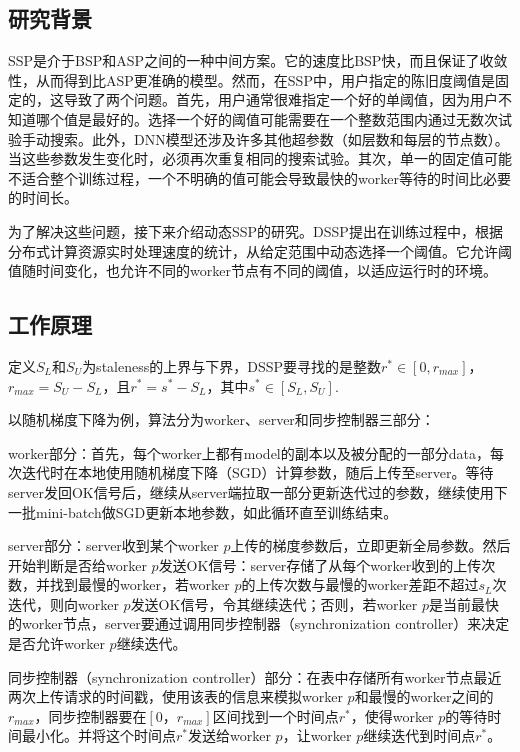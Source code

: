 \documentclass[11pt]{article}
\begin{document}
    \subsection{研究背景}
    SSP是介于BSP和ASP之间的一种中间方案。它的速度比BSP快，而且保证了收敛性，从而得到比ASP更准确的模型。然而，在SSP中，用户指定的陈旧度阈值是固定的，这导致了两个问题。首先，用户通常很难指定一个好的单阈值，因为用户不知道哪个值是最好的。选择一个好的阈值可能需要在一个整数范围内通过无数次试验手动搜索。此外，DNN模型还涉及许多其他超参数（如层数和每层的节点数）。当这些参数发生变化时，必须再次重复相同的搜索试验。其次，单一的固定值可能不适合整个训练过程，一个不明确的值可能会导致最快的worker等待的时间比必要的时间长。

    为了解决这些问题，接下来介绍动态SSP的研究。DSSP提出在训练过程中，根据分布式计算资源实时处理速度的统计，从给定范围中动态选择一个阈值。它允许阈值随时间变化，也允许不同的worker节点有不同的阈值，以适应运行时的环境。

    \subsection{工作原理}
    定义$S_L$和$S_U$为staleness的上界与下界，DSSP要寻找的是整数$r^*\in[0, r_{max}]$，$r_{max} = S_U - S_L$，且$r^* = s^* - S_L$，其中$s^* \in [S_L, S_U]$.

    以随机梯度下降为例，算法分为worker、server和同步控制器三部分：

    \textbullet worker部分：首先，每个worker上都有model的副本以及被分配的一部分data，每次迭代时在本地使用随机梯度下降（SGD）计算参数，随后上传至server。等待server发回OK信号后，继续从server端拉取一部分更新迭代过的参数，继续使用下一批mini-batch做SGD更新本地参数，如此循环直至训练结束。

    \textbullet server部分：server收到某个worker $p$上传的梯度参数后，立即更新全局参数。然后开始判断是否给worker $p$发送OK信号：server存储了从每个worker收到的上传次数，并找到最慢的worker，若worker $p$的上传次数与最慢的worker差距不超过$s_L$次迭代，则向worker $p$发送OK信号，令其继续迭代；否则，若worker $p$是当前最快的worker节点，server要通过调用同步控制器（synchronization controller）来决定是否允许worker $p$继续迭代。

    \textbullet 同步控制器（synchronization controller）部分：在表中存储所有worker节点最近两次上传请求的时间戳，使用该表的信息来模拟worker $p$和最慢的worker之间的$r_{max}$，同步控制器要在$[0，r_{max}]$区间找到一个时间点$r^*$，使得worker $p$的等待时间最小化。并将这个时间点$r^*$发送给worker $p$，让worker $p$继续迭代到时间点$r^*$。
\end{document}
